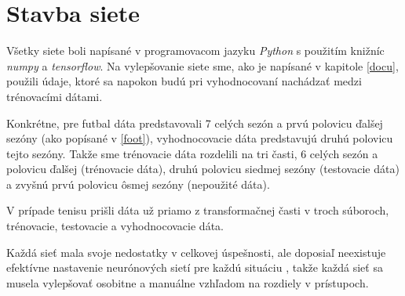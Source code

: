 \chapter{Stavba siete} \label{stavba}

Všetky siete boli napísané v programovacom jazyku \textit{Python} s použitím knižníc \textit{numpy} a \textit{tensorflow}.
Na vylepšovanie siete sme, ako je napísané v kapitole \ref{docu}, použili údaje, ktoré sa napokon budú pri vyhodnocovaní nachádzať medzi trénovacími dátami. 

Konkrétne, pre futbal dáta predstavovali 7 celých sezón a prvú polovicu ďalšej sezóny (ako popísané v \ref{foot}), vyhodnocovacie dáta predstavujú druhú polovicu tejto sezóny. 
Takže sme trénovacie dáta rozdelili na tri časti, 6 celých sezón a polovicu ďalšej (trénovacie dáta), druhú polovicu siedmej sezóny (testovacie dáta) a zvyšnú prvú polovicu ôsmej sezóny (nepoužité dáta).

V prípade tenisu prišli dáta už priamo z transformačnej časti v troch súboroch, trénovacie, testovacie a vyhodnocovacie dáta.

Každá sieť mala svoje nedostatky v celkovej úspešnosti, ale doposiaľ neexistuje efektívne nastavenie neurónových sietí pre každú situáciu \citep{gitgud}, takže každá sieť sa musela vylepšovať osobitne a manuálne vzhľadom na rozdiely v prístupoch.

